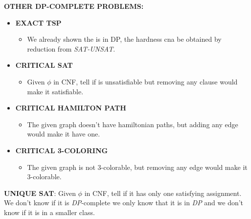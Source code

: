 \textbf{OTHER DP-COMPLETE PROBLEMS:}
\begin{itemize}[label=$\blacksquare$]
    \item \textbf{EXACT TSP}
    \begin{itemize}[label=$\bullet$]
        \item We already shown the is in DP, the hardness cna be obtained by reduction from \textit{SAT-UNSAT}.
    \end{itemize}
    
    \item \textbf{CRITICAL SAT}
    \begin{itemize}[label=$\bullet$]
        \item Given $\phi$ in CNF, tell if is unsatisfiable but removing any clause would make it satisfiable.
    \end{itemize}
    
    \item \textbf{CRITICAL HAMILTON PATH}
    \begin{itemize}[label=$\bullet$]
        \item The given graph doesn't have hamiltonian paths, but adding any edge would make it have one.
    \end{itemize}
    
    \item \textbf{CRITICAL 3-COLORING}
    \begin{itemize}[label=$\bullet$]
        \item The given graph is not 3-colorable, but removing any edge would make it 3-colorable.
    \end{itemize}
\end{itemize}
    
\textbf{UNIQUE SAT}: Given $\phi$ in CNF, tell if it has only one satisfying assignment. We don't know if it is \textit{DP}-complete we only know that it is in \textit{DP} and we don't know if it is in a smaller class. 
